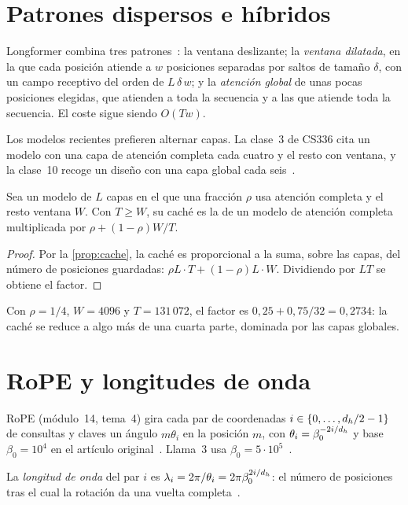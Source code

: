 \section{Patrones dispersos e híbridos}

Longformer combina tres patrones~\cite[§3.1]{longformer}: la ventana deslizante; la \emph{ventana dilatada}, en la que cada posición atiende a $w$ posiciones separadas por saltos de tamaño $\delta$, con un campo receptivo del orden de $L\,\delta\,w$; y la \emph{atención global} de unas pocas posiciones elegidas, que atienden a toda la secuencia y a las que atiende toda la secuencia. El coste sigue siendo $O(Tw)$.

Los modelos recientes prefieren alternar capas. La clase~3 de CS336 cita un modelo con una capa de atención completa cada cuatro y el resto con ventana, y la clase~10 recoge un diseño con una capa global cada seis~\cite{cs336}.

\begin{proposicion}\label{prop:hibrido}
Sea un modelo de $L$ capas en el que una fracción $\rho$ usa atención completa y el resto ventana $W$. Con $T\ge W$, su caché es la de un modelo de atención completa multiplicada por $\rho+(1-\rho)W/T$.
\end{proposicion}

\begin{proof}
Por la \cref{prop:cache}, la caché es proporcional a la suma, sobre las capas, del número de posiciones guardadas: $\rho L\cdot T+(1-\rho)L\cdot W$. Dividiendo por $LT$ se obtiene el factor.
\end{proof}

Con $\rho=1/4$, $W=4096$ y $T=131\,072$, el factor es $0{,}25+0{,}75/32=0{,}2734$: la caché se reduce a algo más de una cuarta parte, dominada por las capas globales.

\section{RoPE y longitudes de onda}

RoPE (módulo~14, tema~4) gira cada par de coordenadas $i\in\{0,\dots,d_{h}/2-1\}$ de consultas y claves un ángulo $m\theta_i$ en la posición $m$, con $\theta_i=\beta_0^{-2i/d_{h}}$ y base $\beta_0=10^{4}$ en el artículo original~\cite[§3.2.2]{roformer}. Llama~3 usa $\beta_0=5\cdot 10^{5}$~\cite[tabla~3]{llama3}.

\begin{definicion}\label{def:onda}
La \emph{longitud de onda} del par $i$ es $\lambda_i=2\pi/\theta_i=2\pi\beta_0^{2i/d_{h}}$: el número de posiciones tras el cual la rotación da una vuelta completa~\cite[ec.~8]{yarn}.
\end{definicion}

